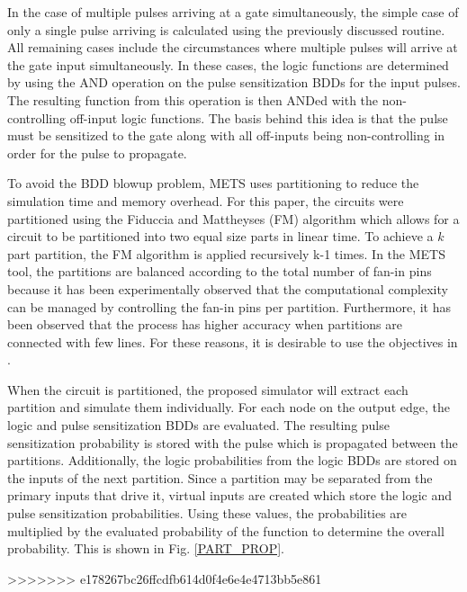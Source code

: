 \documentclass[conference]{IEEEtran}
\begin{document}
In the case of multiple pulses arriving at a gate simultaneously, the simple case of only a single pulse arriving is calculated using the previously discussed routine. All remaining cases include the circumstances where multiple pulses will arrive at the gate input simultaneously. In these cases, the logic functions are determined by using the AND operation on the pulse sensitization BDDs for the input pulses. The resulting function from this operation is then ANDed with the non-controlling off-input logic functions. The basis behind this idea is that the pulse must be sensitized to the gate along with all off-inputs being non-controlling in order for the pulse to propagate.

To avoid the BDD blowup problem, METS uses partitioning to reduce the simulation time and memory overhead. For this paper, the circuits were partitioned using the Fiduccia and Mattheyses (FM) algorithm \cite{Fiduccia1982} which allows for a circuit to be partitioned into two equal size parts in linear time. To achieve a $k$ part partition, the FM algorithm is applied recursively k-1 times. In the METS tool, the partitions are balanced according to the total number of fan-in pins because it has been experimentally observed that the computational complexity can be managed by controlling the fan-in pins per partition. Furthermore, it has been observed that the process has higher accuracy when partitions are connected with few lines. For these reasons, it is desirable to use the objectives in \cite{Fiduccia1982}.

When the circuit is partitioned, the proposed simulator will extract each partition and simulate them individually. For each node on the output edge, the logic and pulse sensitization BDDs are evaluated. The resulting pulse sensitization probability is stored with the pulse which is propagated between the partitions. Additionally, the logic probabilities from the logic BDDs are stored on the inputs of the next partition. Since a partition may be separated from the primary inputs that drive it, virtual inputs are created which store the logic and pulse sensitization probabilities. Using these values, the probabilities are multiplied by the evaluated probability of the function to determine the overall probability. This is shown in Fig. \ref{PART_PROP}.

\setlength{\abovecaptionskip}{-12pt}

\setlength{\belowcaptionskip}{-12pt}
>>>>>>> e178267bc26ffcdfb614d0f4e6e4e4713bb5e861
\end{document}
